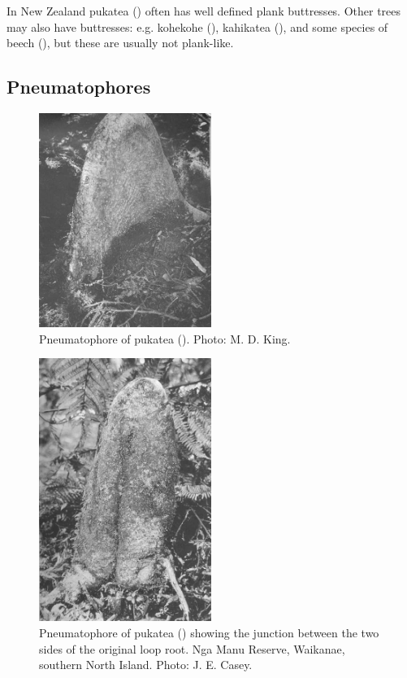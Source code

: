 In New Zealand pukatea () often has well defined plank buttresses.
Other trees may also have buttresses: e.g. kohekohe (), kahikatea (), and some species of beech (), but these are usually not plank-like.

\subsection{Pneumatophores}

\begin{figure}
	\includegraphics[width=0.5\textwidth]{graphics/figure10pukatea.jpg}
	\centering
	\caption[Pneumatophore of pukatea]{Pneumatophore of pukatea ().
    Photo:  M. D. King.}
	\label{fig:10pukatea}
\end{figure}

\begin{figure}
	\includegraphics[width=0.5\textwidth]{graphics/figure11pukatea.jpg}
	\centering
	\caption[Pneumatophore of pukatea showing the junction between the two sides of the original loop root]{Pneumatophore of pukatea () showing the junction between the two sides of the original loop root.
    Nga Manu Reserve, Waikanae, southern North Island.
    Photo:  J. E. Casey.}
	\label{fig:11pukatea}
\end{figure}

